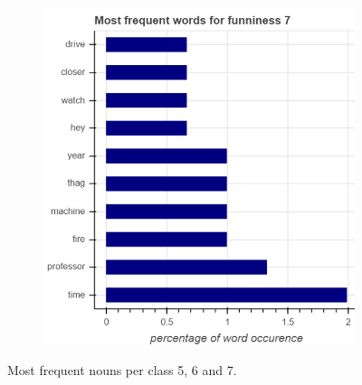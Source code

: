 \documentclass[draft,final,oneside]{vutinfth} %
\begin{document}
\begin{figure}
\begin{subfigure}[b]{0.45\textwidth}
\centering
\includegraphics[width=1.0\textwidth]{graphics/word_occurence/funniness_7}
\end{subfigure}

\caption{Most frequent nouns per class 5, 6 and 7.}
\label{fig:wordocc2}

\end{figure}
\end{document}

